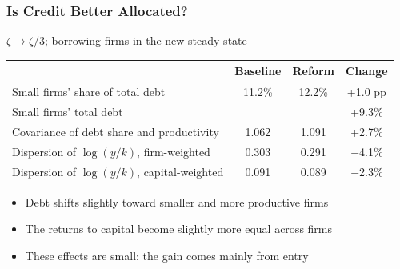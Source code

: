 \documentclass[aspectratio=169,xcolor=table]{beamer}
\begin{document}
\begin{frame}[label=allocation] \frametitle{Is Credit Better Allocated? \hfill \hyperlink{aggregate}{}}

$\zeta \rightarrow \zeta/3$; borrowing firms in the new steady state

\footnotesize
\begin{table}[h!]
\centering
\renewcommand{\arraystretch}{0.9}
\begin{tabular}{lccc}
\toprule
 & \textbf{Baseline} & \textbf{Reform} & \textbf{Change} \\
\midrule
Small firms' share of total debt              & 11.2\% & 12.2\% & +1.0 pp \\
Small firms' total debt                       & & & +9.3\% \\
Covariance of debt share and productivity     & 1.062 & 1.091 & +2.7\% \\
Dispersion of $\log(y/k)$, firm-weighted      & 0.303 & 0.291 & $-$4.1\% \\
Dispersion of $\log(y/k)$, capital-weighted   & 0.091 & 0.089 & $-$2.3\% \\
\bottomrule
\end{tabular}
\end{table}
\normalsize

\begin{itemize} \small
    \item Debt shifts slightly toward smaller and more productive firms
    \item The returns to capital become slightly more equal across firms
    \item These effects are small: the gain comes mainly from entry
\end{itemize}

\end{frame}
\end{document}
